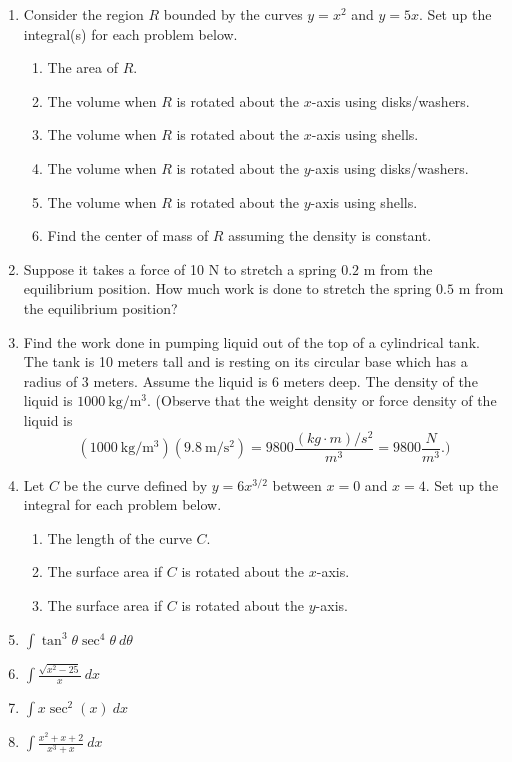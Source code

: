 \documentclass[11pt,fleqn]{article}
\begin{document}
\begin{enumerate}
\item Consider the region $R$  bounded by the curves $y=x^2$ and $y=5x.$ Set up the integral(s) for each problem below.
	\begin{enumerate}
	\item The area of $R$.
	\item The volume when $R$ is rotated about the $x$-axis using disks/washers.
	\item The volume when $R$ is rotated about the $x$-axis using shells.
	\item The volume when $R$ is rotated about the $y$-axis using disks/washers.
	\item The volume when $R$ is rotated about the $y$-axis using shells.
	\item Find the center of mass of $R$ assuming the density is constant.
	\end{enumerate}
\vfill
\item Suppose it takes a force of 10 N to stretch a spring $0.2$ m from the equilibrium position. How much work is done to stretch the spring $0.5$ m from the equilibrium position?
\vfill
\item Find the work done in pumping liquid out of the top of a cylindrical
tank. The tank is 10 meters tall and is resting on its circular base which has a radius of 3 meters. Assume the liquid is 6 meters deep.  The density of the liquid is $1000 \: \text{kg}/\text{m}^3.$ (Observe that the weight density or force density of the liquid is $$(1000  \: \text{kg}/\text{m}^3 ) (9.8 \: \text{m}/\text{s}^2) = 9800 \frac{(kg \cdot m)/s^2}{m^3}= 9800 \frac{N}{m^3}.)$$
\item Let $C$ be the curve defined by $y=6x^{3/2}$ between $x=0$ and $x=4.$ Set up the integral for each problem below.
	\begin{enumerate}
	\item The length of the curve $C.$
	\item The surface area if $C$ is rotated about the $x$-axis.
	\item The surface area if $C$ is rotated about the $y$-axis.
	\end{enumerate}
\vfill
\item $\displaystyle{\int \tan^3 \theta \sec^4 \theta \: d\theta}$
\vfill
\item $\displaystyle{\int \frac{\sqrt{x^2-25}}{x} \: dx}$
\vfill
\item $\displaystyle{\int x \sec^2(x) \: dx}$
\vfill
\item $\displaystyle{\int  \frac{x^2+x+2}{x^3+x}\: dx}$
\vfill
\end{enumerate}
\end{document}
